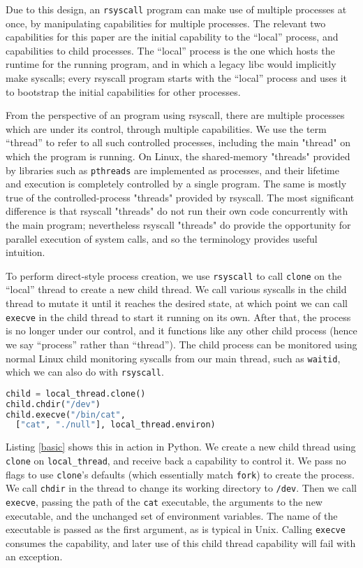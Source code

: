 \documentclass[sigplan]{acmart}
\begin{document}
Due to this design, an \texttt{rsyscall} program can make use of multiple processes at once,
by manipulating capabilities for multiple processes.
The relevant two capabilities for this paper are the initial capability to the ``local'' process,
and capabilities to child processes.
The ``local'' process is the one which hosts the runtime for the running program,
and in which a legacy libc would implicitly make syscalls;
every rsyscall program starts with the ``local'' process
and uses it to bootstrap the initial capabilities for other processes.

From the perspective of an program using rsyscall,
there are multiple processes which are under its control,
through multiple capabilities.
We use the term ``thread'' to refer to all such controlled processes,
including the main "thread" on which the program is running.
On Linux, the shared-memory "threads" provided by libraries such as \texttt{pthreads}
are implemented as processes,
and their lifetime and execution is completely controlled by a single program.
The same is mostly true of the controlled-process "threads" provided by rsyscall.
The most significant difference is that rsyscall "threads"
do not run their own code concurrently with the main program;
nevertheless rsyscall "threads" do provide the opportunity for parallel execution of system calls,
and so the terminology provides useful intuition.

To perform direct-style process creation,
we use \texttt{rsyscall} to call \texttt{clone} on the ``local'' thread to create a new child thread.
We call various syscalls in the child thread to mutate it until it reaches the desired state,
at which point we can call \texttt{execve} in the child thread to start it running on its own.
After that, the process is no longer under our control, and it functions like any other child process
(hence we say ``process'' rather than ``thread'').
The child process can be monitored using normal Linux child monitoring syscalls from our main thread,
such as \texttt{waitid},
which we can also do with \texttt{rsyscall}.

\begin{lstlisting}[float=*,language=Python,label={basic},caption={Creating a new process, changing CWD, and execing}]
child = local_thread.clone()
child.chdir("/dev")
child.execve("/bin/cat",
  ["cat", "./null"], local_thread.environ)
\end{lstlisting}
Listing \ref{basic} shows this in action in Python.
We create a new child thread using \texttt{clone} on \verb|local_thread|,
and receive back a capability to control it.
We pass no flags to use \texttt{clone}'s defaults
(which essentially match \texttt{fork}) to create the process.
We call \texttt{chdir} in the thread to change its working directory to \texttt{/dev}.
Then we call \texttt{execve},
passing the path of the \texttt{cat} executable,
the arguments to the new executable,
and the unchanged set of environment variables.
The name of the executable is passed as the first argument,
as is typical in Unix.
Calling \texttt{execve} consumes the capability,
and later use of this child thread capability will fail with an exception.
\end{document}
